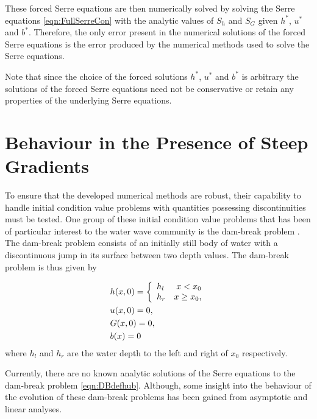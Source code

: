 These forced Serre equations are then numerically solved by solving the Serre equations \eqref{eqn:FullSerreCon} with the analytic values of $S_{h}$ and $S_{G}$ given $h^*$, $u^*$ and $b^*$. Therefore, the only error present in the numerical solutions of the forced Serre equations is the error produced by the numerical methods used to solve the Serre equations.

Note that since the choice of the forced solutions $h^*$, $u^*$ and $b^*$ is arbitrary the solutions of the forced Serre equations need not be conservative or retain any properties of the underlying Serre equations. 


\section{Behaviour in the Presence of Steep Gradients}
To ensure that the developed numerical methods are robust, their capability to handle initial condition value problems with quantities possessing discontinuities must be tested. One group of these initial condition value problems that has been of particular interest to the water wave community is the dam-break problem \cite{El-etal-2006,Hank-etal-2010-2034,Mitsotakis-etal-2014,Mitsotakis-etal-2017,doCarmo-etal-2018-404}. The dam-break problem consists of an initially still body of water with a discontinuous jump in its surface between two depth values. The dam-break problem is thus given by

\begin{subequations}
	\begin{align}
	&h(x,0) =\left\lbrace \begin{array}{l r}
	h_l & x < x_0 \\
	h_r & x \ge x_0,
	\end{array} \right. \\
	&u(x,0) = 0 , \\
	&G(x,0) = 0 , \\
	&b(x) = 0
	\end{align}
	\label{eqn:DBdefhub}
\end{subequations} 
where $h_l$ and $h_r$ are the water depth to the left and right of $x_0$ respectively. 

Currently, there are no known analytic solutions of the Serre equations to the dam-break problem \eqref{eqn:DBdefhub}. Although, some insight into the behaviour of the evolution of these dam-break problems has been gained from asymptotic \cite{El-etal-2006} and linear \cite{Dougalis-etal-2007} analyses. 

